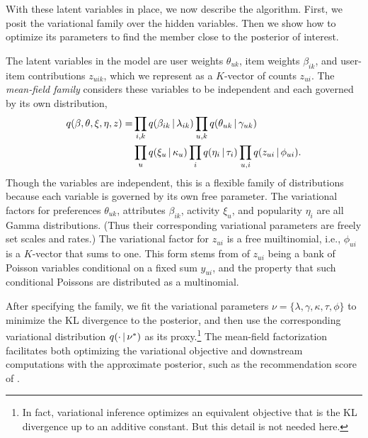 With these latent variables in place, we now describe the algorithm.
First, we posit the variational family over the hidden variables.
Then we show how to optimize its parameters to find the member close
to the posterior of interest.

The latent variables in the model are user weights $\theta_{uk}$, item
weights $\beta_{ik}$, and user-item contributions $z_{uik}$, which we
represent as a $K$-vector of counts $z_{ui}$.  The \textit{mean-field
  family} considers these variables to be independent and each
governed by its own distribution,
\begin{align}
  \label{eq:q}
  q(\beta, \theta, \xi, \eta, z) =& \prod_{i,k} q(\beta_{ik} \,\vert\, \lambda_{ik})
  \prod_{u,k} q(\theta_{uk} \,\vert\, \gamma_{uk}) \nonumber\\
  & \prod_{u} q(\xi_u \,\vert\, \kappa_u) \prod_{i} q(\eta_i \,\vert\, \tau_i)
  \prod_{u,i} q(z_{ui} \,\vert\, \phi_{ui}).
\end{align}
Though the variables are independent, this is a flexible family of
distributions because each variable is governed by its own free
parameter.  The variational factors for preferences $\theta_{uk}$,
attributes $\beta_{ik}$, activity $\xi_u$, and popularity $\eta_i$ are
all Gamma distributions.  (Thus their corresponding variational
parameters are freely set scales and rates.)  The variational factor
for $z_{ui}$ is a free muiltinomial, i.e., $\phi_{ui}$ is a $K$-vector
that sums to one.  This form stems from of $z_{ui}$ being a bank of
Poisson variables conditional on a fixed sum $y_{ui}$, and the
property that such conditional Poissons are distributed as a
multinomial.




After specifying the family, we fit the variational parameters $\nu =
\{\lambda, \gamma, \kappa, \tau, \phi\}$ to minimize the KL divergence
to the posterior, and then use the corresponding variational
distribution $q(\cdot \,\vert\, \nu^*)$ as its proxy.\footnote{In fact,
  variational inference optimizes an equivalent objective that is the
  KL divergence up to an additive constant.  But this detail is not
  needed here.}  The mean-field factorization facilitates both
optimizing the variational objective and downstream computations with
the approximate posterior, such as the recommendation score of
.

